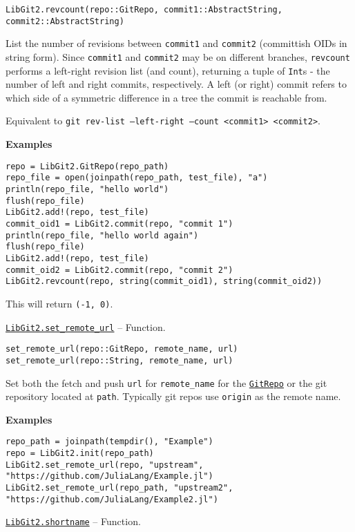 \begin{adjustwidth}{2em}{0pt}


\begin{verbatim}
LibGit2.revcount(repo::GitRepo, commit1::AbstractString, commit2::AbstractString)
\end{verbatim}

List the number of revisions between \texttt{commit1} and \texttt{commit2} (committish OIDs in string form). Since \texttt{commit1} and \texttt{commit2} may be on different branches, \texttt{revcount} performs a {\textquotedbl}left-right{\textquotedbl} revision list (and count), returning a tuple of \texttt{Int}s - the number of left and right commits, respectively. A left (or right) commit refers to which side of a symmetric difference in a tree the commit is reachable from.

Equivalent to \texttt{git rev-list --left-right --count <commit1> <commit2>}.

\textbf{Examples}


\begin{verbatim}
repo = LibGit2.GitRepo(repo_path)
repo_file = open(joinpath(repo_path, test_file), "a")
println(repo_file, "hello world")
flush(repo_file)
LibGit2.add!(repo, test_file)
commit_oid1 = LibGit2.commit(repo, "commit 1")
println(repo_file, "hello world again")
flush(repo_file)
LibGit2.add!(repo, test_file)
commit_oid2 = LibGit2.commit(repo, "commit 2")
LibGit2.revcount(repo, string(commit_oid1), string(commit_oid2))
\end{verbatim}

This will return \texttt{(-1, 0)}.



\end{adjustwidth}
\hypertarget{17796350858376315108}{}
\hyperlink{17796350858376315108}{\texttt{LibGit2.set\_remote\_url}}  -- {Function.}

\begin{adjustwidth}{2em}{0pt}


\begin{verbatim}
set_remote_url(repo::GitRepo, remote_name, url)
set_remote_url(repo::String, remote_name, url)
\end{verbatim}

Set both the fetch and push \texttt{url} for \texttt{remote\_name} for the \hyperlink{3263346103236484748}{\texttt{GitRepo}} or the git repository located at \texttt{path}. Typically git repos use \texttt{{\textquotedbl}origin{\textquotedbl}} as the remote name.

\textbf{Examples}


\begin{verbatim}
repo_path = joinpath(tempdir(), "Example")
repo = LibGit2.init(repo_path)
LibGit2.set_remote_url(repo, "upstream", "https://github.com/JuliaLang/Example.jl")
LibGit2.set_remote_url(repo_path, "upstream2", "https://github.com/JuliaLang/Example2.jl")
\end{verbatim}



\end{adjustwidth}
\hypertarget{16470264269906288721}{}
\hyperlink{16470264269906288721}{\texttt{LibGit2.shortname}}  -- {Function.}

